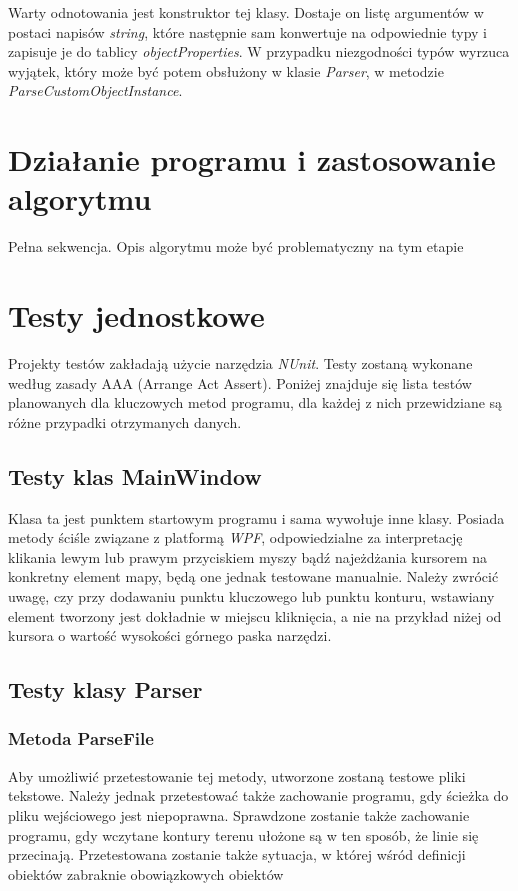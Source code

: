 \documentclass[a4paper,11pt]{article}
\newcommand\tab[1][0.6cm]{\hspace*{#1}}
\begin{document}
Warty odnotowania jest konstruktor tej klasy. Dostaje on listę argumentów w postaci napisów \textit{string}, które następnie sam konwertuje na odpowiednie typy i zapisuje je do tablicy \textit{objectProperties}. W przypadku niezgodności typów wyrzuca wyjątek, który może być potem obsłużony w klasie \textit{Parser}, w metodzie \textit{ParseCustomObjectInstance}.

\section{Działanie programu i zastosowanie algorytmu}

\tab Pełna sekwencja. Opis algorytmu może być problematyczny na tym etapie

\section{Testy jednostkowe}

\tab Projekty testów zakładają użycie narzędzia \textit{NUnit}. Testy zostaną wykonane według zasady AAA (Arrange Act Assert). Poniżej znajduje się lista testów planowanych dla kluczowych metod programu, dla każdej z nich przewidziane są różne przypadki otrzymanych danych. 

\subsection{Testy klas MainWindow}

\tab Klasa ta jest punktem startowym programu i sama wywołuje inne klasy. Posiada metody ściśle związane z platformą \textit{WPF}, odpowiedzialne za interpretację klikania lewym lub prawym przyciskiem myszy bądź najeżdżania kursorem na konkretny element mapy, będą one jednak testowane manualnie. Należy zwrócić uwagę, czy przy dodawaniu punktu kluczowego lub punktu konturu, wstawiany element tworzony jest dokładnie w miejscu kliknięcia, a nie na przykład niżej od kursora o wartość wysokości górnego paska narzędzi.

\subsection{Testy klasy Parser}

\subsubsection{Metoda ParseFile}
\tab Aby umożliwić przetestowanie tej metody, utworzone zostaną testowe pliki tekstowe. Należy jednak przetestować także zachowanie programu, gdy ścieżka do pliku wejściowego jest niepoprawna. Sprawdzone zostanie także zachowanie programu, gdy wczytane kontury terenu ułożone są w ten sposób, że linie się przecinają. Przetestowana zostanie także sytuacja, w której wśród definicji obiektów zabraknie obowiązkowych obiektów
\end{document}
